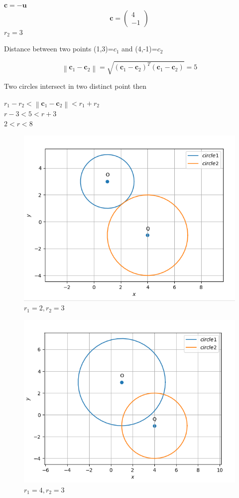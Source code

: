 \documentclass[10pt, a4paper]{article}
\let\vec\mathbf
\begin{document}
\begin{center}
$\vec{c} = \vec{-u}$\\
$$\vec{c}=\begin{pmatrix}
4\\ 
-1
\end{pmatrix} $$
$r_{2}=3$
\end{center} 
Distance between two points (1,3)=$c_{1}$ and (4,-1)=$c_{2}$
\begin{center}
$$\left \| \vec{c}_{1}-\vec{c}_{2} \right\|=\sqrt{ (\vec{c}_{1}-\vec{c}_{2})^{T}(\vec{c}_{1}-\vec{c}_{2})}=5$$
\end{center} 
Two circles intersect in two distinct point then 
\begin{center}
$r_{1}-r_{2}<$$\left \| \vec{c}_{1}-\vec{c}_{2} \right\|<r_{1}+r_{2}$\\
$r-3<5<r+3$\\
$2<r<8$
\end{center} 
\begin{figure}[h!]
  \includegraphics[scale=0.5]{fig1.png}
  \caption{$r_{1}=2,r_{2}=3$}
  \label{fig:circle assignment}
\end{figure}
\begin{figure}[h!]
  \includegraphics[scale=0.5]{fig2.png}
  \caption{$r_{1}=4,r_{2}=3$ }
  \label{fig:circle assignment}
\end{figure}
\end{document}
